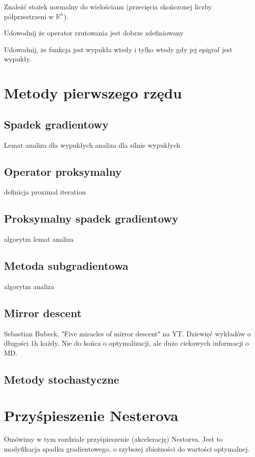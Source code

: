 \documentclass[10pt,a4paper,draft]{report}
\begin{document}
\begin{problem}
Znaleźć stożek normalny do wielościanu (przecięcia skończonej liczby półprzestrzeni w $\mathbb{R}^n$). 
\end{problem}
\begin{problem}
Udowodnij że operator rzutowania jest dobrze zdefiniowany
\end{problem}
\begin{problem}
Udowodnij, że funkcja jest wypukła wtedy i tylko wtedy gdy jej epigraf jest wypukły.
\end{problem}



\chapter{Metody pierwszego rzędu}
\section{Spadek gradientowy}
Lemat
analiza dla wypukłych
analiza dla silnie wypukłych
\section{Operator proksymalny}
definicja
proximal iteration

\section{Proksymalny spadek gradientowy}
algorytm
lemat
analiza
\section{Metoda subgradientowa}
algorytm
analiza

\section{Mirror descent}

Sebastian Bubeck, "Five miracles of mirror descent" na YT. Dziewięć wykładów o długości 1h każdy. Nie do końca o optymalizacji, ale dużo ciekawych informacji o MD.

\section{Metody stochastyczne}

\chapter{Przyśpieszenie Nesterova}
Omówimy w tym rozdziale przyśpieszenie (akcelerację) Nestorva. Jest to modyfikacja spadku gradientowego, o szybszej zbieżności do wartości optymalnej.
\end{document}
